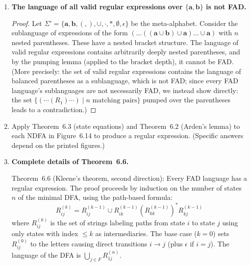 \begin{enumerate}[{6.}1.]
\begin{enumerate}[(a)]
  \item Words for which the last two letters match ($\pmb{aa}$ or $\pmb{bb}$ at the end):
  \[
    (\pmb{a}\cup\pmb{b})^*\pmb{aa} \cup (\pmb{a}\cup\pmb{b})^*\pmb{bb}
  \]

  \item Words for which the first two letters match ($\pmb{aa}$ or $\pmb{bb}$ at the start):
  \[
    \pmb{aa}(\pmb{a}\cup\pmb{b})^* \cup \pmb{bb}(\pmb{a}\cup\pmb{b})^*
  \]
  (Also include words of length $<2$: $\lambda$ and $\pmb{a}$ and $\pmb{b}$ trivially satisfy the vacuous condition; but ``first two letters match'' requires length $\ge 2$.)

  \item Words for which the first and last letters match:
  \[
    \epsilon \cup \pmb{a} \cup \pmb{b} \cup \pmb{a}(\pmb{a}\cup\pmb{b})^*\pmb{a} \cup \pmb{b}(\pmb{a}\cup\pmb{b})^*\pmb{b}
  \]
\end{enumerate}

\item \textbf{The language of all valid regular expressions over $\{\pmb{a},\pmb{b}\}$ is not FAD.}

\begin{proof}
Let $\Sigma'=\{\pmb{a},\pmb{b},(,),\cup,\cdot,*,\emptyset,\epsilon\}$ be the meta-alphabet.  Consider the sublanguage of expressions of the form $(\ldots((\pmb{a}\cup\pmb{b})\cup\pmb{a})\ldots\cup\pmb{a})$ with $n$ nested parentheses.  These have a nested bracket structure.  The language of valid regular expressions contains arbitrarily deeply nested parentheses, and by the pumping lemma (applied to the bracket depth), it cannot be FAD.  (More precisely: the set of valid regular expressions contains the language of balanced parentheses as a sublanguage, which is not FAD; since every FAD language's sublanguages are not necessarily FAD, we instead show directly: the set $\{(\cdots(R_1)\cdots)\mid n\text{ matching pairs}\}$ pumped over the parentheses leads to a contradiction.)
\end{proof}

\item Apply Theorem~6.3 (state equations) and Theorem~6.2 (Arden's lemma) to each NDFA in Figure~6.14 to produce a regular expression.  (Specific answers depend on the printed figures.)

\item \textbf{Complete details of Theorem~6.6.}

Theorem~6.6 (Kleene's theorem, second direction): Every FAD language has a regular expression.
The proof proceeds by induction on the number of states $n$ of the minimal DFA, using the path-based formula:
\[
  R^{(k)}_{ij} = R^{(k-1)}_{ij} \cup R^{(k-1)}_{ik}(R^{(k-1)}_{kk})^* R^{(k-1)}_{kj}
\]
where $R^{(k)}_{ij}$ is the set of strings labeling paths from state $i$ to state $j$ using only states with index $\le k$ as intermediaries.  The base case ($k=0$) sets $R^{(0)}_{ij}$ to the letters causing direct transitions $i\to j$ (plus $\epsilon$ if $i=j$).  The language of the DFA is $\bigcup_{j\in F}R^{(n)}_{1j}$.


\end{enumerate}
